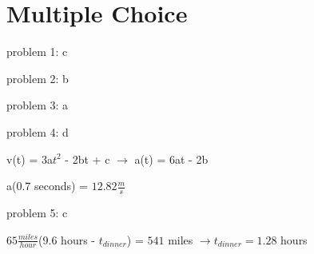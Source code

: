 \chapter{Multiple Choice}
\label{Multiple Choice}
problem 1: c

problem 2: b

problem 3: a

problem 4: d

v(t) = 3a$t^{2}$ - 2bt + c $\rightarrow$ a(t) = 6at - 2b

a(0.7 seconds) = $12.82 \frac{m}{s}$


problem 5: c

$65\frac{miles}{hour}$(9.6 hours - $t_{dinner}$) = $541$ miles $\rightarrow t_{dinner} = 1.28$ hours
